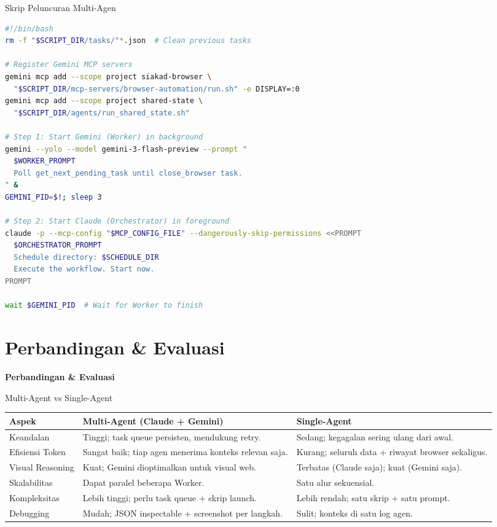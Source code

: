 \documentclass[aspectratio=169, table]{beamer}
\begin{document}
\begin{frame}[fragile]{Skrip Peluncuran Multi-Agen}
\vspace{4pt}
\begin{lstlisting}[language=bash, basicstyle=\ttfamily\tiny]
#!/bin/bash
rm -f "$SCRIPT_DIR/tasks/"*.json  # Clean previous tasks

# Register Gemini MCP servers
gemini mcp add --scope project siakad-browser \
  "$SCRIPT_DIR/mcp-servers/browser-automation/run.sh" -e DISPLAY=:0
gemini mcp add --scope project shared-state \
  "$SCRIPT_DIR/agents/run_shared_state.sh"

# Step 1: Start Gemini (Worker) in background
gemini --yolo --model gemini-3-flash-preview --prompt "
  $WORKER_PROMPT
  Poll get_next_pending_task until close_browser task.
" &
GEMINI_PID=$!; sleep 3

# Step 2: Start Claude (Orchestrator) in foreground
claude -p --mcp-config "$MCP_CONFIG_FILE" --dangerously-skip-permissions <<PROMPT
  $ORCHESTRATOR_PROMPT
  Schedule directory: $SCHEDULE_DIR
  Execute the workflow. Start now.
PROMPT

wait $GEMINI_PID  # Wait for Worker to finish
\end{lstlisting}
\end{frame}

\section{Perbandingan \& Evaluasi}
\begin{frame}{\hfill}
	\centering
	\Huge{\textbf{Perbandingan \& Evaluasi}}
\end{frame}

\begin{frame}{Multi-Agent vs Single-Agent}
\vspace{4pt}
\centering
\footnotesize
\begin{tabular}{|>{\raggedright\arraybackslash}p{}|>{\raggedright\arraybackslash}p{}|>{\raggedright\arraybackslash}p{}|}
\hline
\rowcolor{blue!12}
\textbf{Aspek} & \textbf{Multi-Agent (Claude + Gemini)} & \textbf{Single-Agent} \\
\hline
Keandalan & Tinggi; task queue persisten, mendukung retry. & Sedang; kegagalan sering ulang dari awal. \\
\hline
Efisiensi Token & Sangat baik; tiap agen menerima konteks relevan saja. & Kurang; seluruh data + riwayat browser sekaligus. \\
\hline
Visual Reasoning & Kuat; Gemini dioptimalkan untuk visual web. & Terbatas (Claude saja); kuat (Gemini saja). \\
\hline
Skalabilitas & Dapat paralel beberapa Worker. & Satu alur sekuensial. \\
\hline
Kompleksitas & Lebih tinggi; perlu task queue + skrip launch. & Lebih rendah; satu skrip + satu prompt. \\
\hline
Debugging & Mudah; JSON inspectable + screenshot per langkah. & Sulit; konteks di satu log agen. \\
\hline
\end{tabular}
\end{frame}
\end{document}
